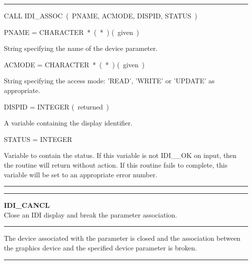 \documentclass[11pt,nolof]{starlink}
\begin{document}
{\rule{160mm}{0.1mm}

\hspace*{10mm}\parbox{140mm}{
CALL IDI\_ASSOC~(~PNAME, ACMODE, DISPID, STATUS~)}

\hspace*{10mm}\parbox{140mm}{
PNAME = CHARACTER~*~(~*~) \hspace{10mm} (~given~)}

\hspace*{30mm}\parbox{120mm}{
String specifying the name of the device parameter.}

\hspace*{10mm}\parbox{140mm}{
ACMODE = CHARACTER~*~(~*~) \hspace{10mm} (~given~)}

\hspace*{30mm}\parbox{120mm}{
String specifying the access mode: 'READ', 'WRITE' or 'UPDATE' as
appropriate.}

\hspace*{10mm}\parbox{140mm}{
DISPID = INTEGER \hspace{10mm} (~returned~)}

\hspace*{30mm}\parbox{120mm}{
A variable containing the display identifier.}

\hspace*{10mm}\parbox{140mm}{
STATUS = INTEGER}

\hspace*{30mm}\parbox{120mm}{
Variable to contain the status. If this variable is not IDI\_\_OK on input,
then the routine will return without action. If this routine fails to
complete, this variable will be set to an appropriate error number.}

\rule{160mm}{0.5mm}


\rule{160mm}{0.5mm}

\hspace*{10mm}\parbox{140mm}{
\textbf{IDI\_CANCL\label{IDI_CANCL}} \\
Close an IDI display and break the parameter association.}

\rule{160mm}{0.1mm}

\hspace*{10mm}\parbox{140mm}{
The device associated with the parameter is closed and the association
between the graphics device and the specified device parameter is broken.}

\rule{160mm}{0.1mm}

}
\end{document}
